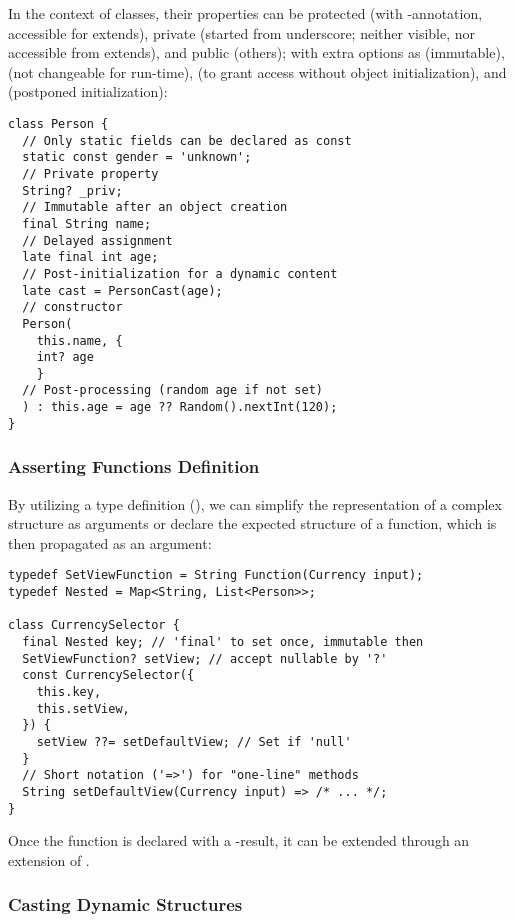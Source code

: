 \noindent In the context of classes, their properties can be protected (with -annotation, accessible for 
extends), private (started from underscore; neither visible, nor accessible from extends), and public (others); 
with extra options as  (immutable),  (not changeable for run-time),  (to 
grant access without object initialization), and  (postponed initialization):

\begin{lstlisting}
class Person {
  // Only static fields can be declared as const
  static const gender = 'unknown';
  // Private property
  String? _priv;
  // Immutable after an object creation
  final String name;
  // Delayed assignment
  late final int age;
  // Post-initialization for a dynamic content
  late cast = PersonCast(age);
  // constructor
  Person(
    this.name, {
    int? age
    }
  // Post-processing (random age if not set)
  ) : this.age = age ?? Random().nextInt(120);
}
\end{lstlisting}


\subsubsection{Asserting Functions Definition}

By utilizing a type definition (), we can simplify the representation of a complex structure as arguments or 
declare the expected structure of a function, which is then propagated as an argument:

\begin{lstlisting}
typedef SetViewFunction = String Function(Currency input);
typedef Nested = Map<String, List<Person>>;

class CurrencySelector {
  final Nested key; // 'final' to set once, immutable then
  SetViewFunction? setView; // accept nullable by '?'
  const CurrencySelector({
    this.key,
    this.setView,
  }) {
    setView ??= setDefaultView; // Set if 'null'
  }
  // Short notation ('=>') for "one-line" methods
  String setDefaultView(Currency input) => /* ... */;
}
\end{lstlisting}

\noindent Once the function is declared with a -result, it can be extended through an extension of
.


\subsubsection{Casting Dynamic Structures}

